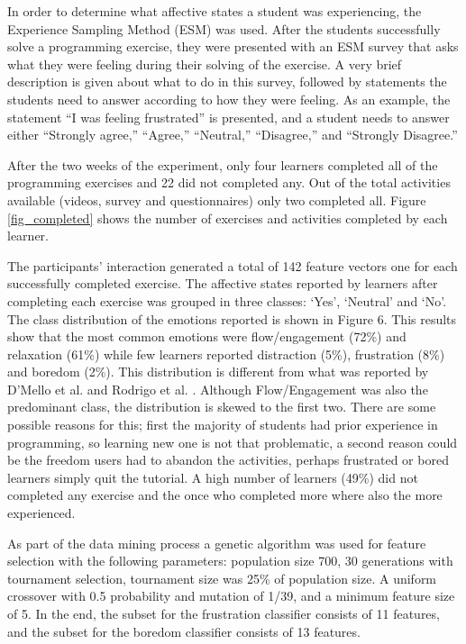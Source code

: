 \documentclass[a4paper,twoside]{article}
\begin{document}
In order to determine what affective states a student was experiencing, the
Experience Sampling Method (ESM) \cite{kubey1996experience} was used.
After the students successfully solve a programming exercise, they were presented
with an ESM survey that asks what they were feeling during their solving of the
exercise. A very brief description is given about what to do in this survey,
followed by statements the students need to answer according to how they were
feeling. As an example, the statement “I was feeling frustrated” is presented,
and a student needs to answer either “Strongly agree,” “Agree,” “Neutral,”
“Disagree,” and “Strongly Disagree.”

After the two weeks of the experiment, only four learners completed all of the
programming exercises and 22 did not completed any. Out of the total activities
available (videos, survey and questionnaires) only two completed all. Figure \ref{fig_completed}
shows the number of exercises and activities completed by each learner.
  
The participants' interaction generated a total of 142 feature vectors one for each
successfully completed exercise. The affective states reported by learners after
completing each exercise was grouped in three classes: ‘Yes’, ‘Neutral’ and
‘No’. The class distribution of the emotions reported is shown in Figure 6. This
results show that the most common emotions were flow/engagement (72\%) and
relaxation (61\%) while few learners reported distraction (5\%), frustration
(8\%) and boredom (2\%). This distribution is different from what was reported
by D’Mello et al. \cite{bixler2013detecting} and Rodrigo et al. \cite{rodrigo2009affective}.
Although Flow/Engagement was
also the predominant class, the distribution is skewed to the first two. There
are some possible reasons for this; first the majority of students had
prior experience in programming, so learning new one is not that problematic, a second
reason could be the freedom users had to abandon the activities, perhaps
frustrated or bored learners simply quit the tutorial. A high number of learners
(49\%) did not completed any exercise and the once who completed more where also
the more experienced.

As part of the data mining process a genetic algorithm was used for feature
selection with the following parameters: population size 700, 30 generations with
tournament selection, tournament size was 25\% of population size. A uniform crossover 
with 0.5 probability and mutation of 1/39, and a minimum feature size of 5.
In the end, the subset for the frustration classifier
consists of 11 features, and the subset for the boredom classifier consists of
13 features.
\end{document}
